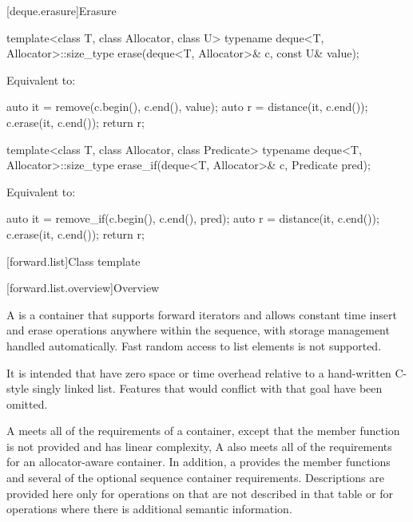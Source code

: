 [deque.erasure]{Erasure}

%
\begin{itemdecl}
template<class T, class Allocator, class U>
  typename deque<T, Allocator>::size_type
    erase(deque<T, Allocator>& c, const U& value);
\end{itemdecl}

\begin{itemdescr}
\pnum
\effects
Equivalent to:
\begin{codeblock}
auto it = remove(c.begin(), c.end(), value);
auto r = distance(it, c.end());
c.erase(it, c.end());
return r;
\end{codeblock}
\end{itemdescr}

%
\begin{itemdecl}
template<class T, class Allocator, class Predicate>
  typename deque<T, Allocator>::size_type
    erase_if(deque<T, Allocator>& c, Predicate pred);
\end{itemdecl}

\begin{itemdescr}
\pnum
\effects
Equivalent to:
\begin{codeblock}
auto it = remove_if(c.begin(), c.end(), pred);
auto r = distance(it, c.end());
c.erase(it, c.end());
return r;
\end{codeblock}
\end{itemdescr}

[forward.list]{Class template }

[forward.list.overview]{Overview}

\pnum
A  is a container that supports forward iterators and allows
constant time insert and erase operations anywhere within the sequence, with storage
management handled automatically. Fast random access to list elements is not supported.
\begin{note}
It is intended that  have zero space or time overhead
relative to a hand-written C-style singly linked list. Features that would conflict with
that goal have been omitted.
\end{note}

\pnum
A  meets all of the requirements
of a container,
except that the  member function is not provided and
 has linear complexity,
A  also meets all of the requirements
for an allocator-aware container.
In addition, a 
provides the  member functions and
several of the optional sequence container requirements.
Descriptions are provided here only for operations on
 that are not described in that table or for operations where there
is additional semantic information.

